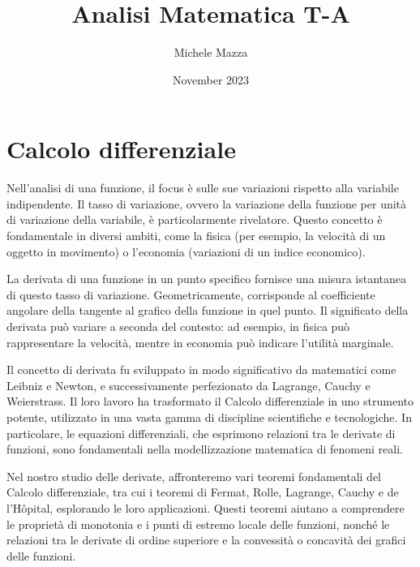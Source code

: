 \documentclass{book}
\title{Analisi Matematica T-A}
\author{Michele Mazza}
\date{November 2023}
\begin{document}
\frontmatter
\maketitle
\tableofcontents
\mainmatter

\chapter{Calcolo differenziale}
Nell'analisi di una funzione, il focus è sulle sue variazioni rispetto alla variabile indipendente. Il tasso di variazione, ovvero la variazione della funzione per unità di variazione della variabile, è particolarmente rivelatore. Questo concetto è fondamentale in diversi ambiti, come la fisica (per esempio, la velocità di un oggetto in movimento) o l'economia (variazioni di un indice economico).

La derivata di una funzione in un punto specifico fornisce una misura istantanea di questo tasso di variazione. Geometricamente, corrisponde al coefficiente angolare della tangente al grafico della funzione in quel punto. Il significato della derivata può variare a seconda del contesto: ad esempio, in fisica può rappresentare la velocità, mentre in economia può indicare l'utilità marginale.

Il concetto di derivata fu sviluppato in modo significativo da matematici come Leibniz e Newton, e successivamente perfezionato da Lagrange, Cauchy e Weierstrass. Il loro lavoro ha trasformato il Calcolo differenziale in uno strumento potente, utilizzato in una vasta gamma di discipline scientifiche e tecnologiche. In particolare, le equazioni differenziali, che esprimono relazioni tra le derivate di funzioni, sono fondamentali nella modellizzazione matematica di fenomeni reali.

Nel nostro studio delle derivate, affronteremo vari teoremi fondamentali del Calcolo differenziale, tra cui i teoremi di Fermat, Rolle, Lagrange, Cauchy e de l'Hôpital, esplorando le loro applicazioni. Questi teoremi aiutano a comprendere le proprietà di monotonia e i punti di estremo locale delle funzioni, nonché le relazioni tra le derivate di ordine superiore e la convessità o concavità dei grafici delle funzioni.
\end{document}
